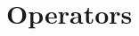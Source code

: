 \section{Operators}


\begin{comment}

-linear operators: integral, differential
-eigenfunctions and eigenvalues
-solving operator equations

\end{comment} 